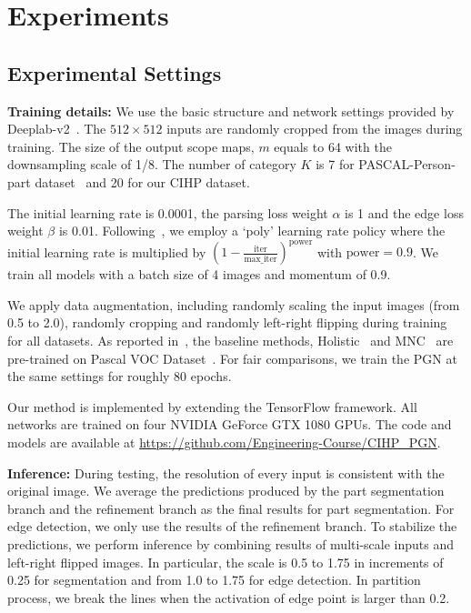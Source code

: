 \documentclass[runningheads]{llncs}
\begin{document}
\section{Experiments}


\subsection{Experimental Settings}


\textbf{Training details:}
We use the basic structure and network settings provided by Deeplab-v2~\cite{chen2016deeplab}. The $512 \times 512$ inputs are randomly cropped from the images during training. The size of the output scope maps, $m$ equals to 64 with the downsampling scale of 1/8. The number of category $K$ is 7 for PASCAL-Person-part dataset~\cite{chen2014detect} and 20 for our CIHP dataset.


The initial learning rate is 0.0001, the parsing loss weight $\alpha$ is 1 and the edge loss weight $\beta$ is 0.01. Following~\cite{chen2017rethinking}, we employ a `poly' learning rate policy where the initial learning rate is multiplied by
$(1-\frac{ \text{iter} }{ \text{max\_iter}})^\text{power}$ with $\text{power} = 0.9$. We train all models with a batch size of 4 images and momentum of 0.9.

We apply data augmentation, including randomly scaling the input images (from 0.5 to 2.0), randomly cropping and randomly left-right flipping during training for all datasets. As reported in~\cite{li2017holistic}, the baseline methods, Holistic~\cite{li2017holistic} and MNC~\cite{Dai_2016_CVPR} are pre-trained on Pascal VOC Dataset~\cite{everingham2010pascal}. For fair comparisons, we train the PGN at the same settings for roughly 80 epochs.

Our method is implemented by extending the TensorFlow framework. All networks are trained on four NVIDIA GeForce GTX 1080 GPUs. The code and models are available at \url{https://github.com/Engineering-Course/CIHP_PGN}.

\textbf{Inference:}
During testing, the resolution of every input is consistent with the original image. We average the predictions produced by the part segmentation branch and the refinement branch as the final results for part segmentation. For edge detection, we only use the results of the refinement branch. To stabilize the predictions, we perform inference by combining results of multi-scale inputs and left-right flipped images. In particular, the scale is 0.5 to 1.75 in increments of 0.25 for segmentation and from 1.0 to 1.75 for edge detection. In partition process, we break the lines when the activation of edge point is larger than 0.2.
\end{document}
